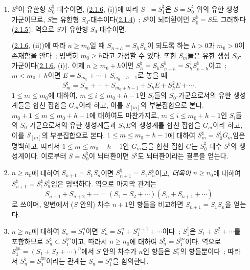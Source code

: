 \begin{enumerate}
\item[\rm(i)] $S^\natural$이 유한형 $S_0^\natural$-대수이면,
(\hyperref[II.2.1.6-ko]{2.1.6}, (i))에 따라
$S_+=S_1^\natural$은 $S=S_0^\natural$ 위의 유한 생성 가군이므로,
$S$는 유한형 $S_0$-대수이다(\hyperref[II.2.1.4-ko]{2.1.4})~;
$S^\natural$이 뇌터환이면 $S_0^\natural=S$도 그러하다
(\hyperref[II.2.1.5-ko]{2.1.5}). 역으로 $S$가 유한형 $S_0$-대수이면,

(\hyperref[II.2.1.6-ko]{2.1.6}, (ii))에 따라 $n\geq m_0$일 때
$S_{n+h}=S_hS_n$이 되도록 하는 $h>0$과 $m_0>0$이 존재함을 안다~;
명백히 $m_0\geq h$라고 가정할 수 있다. 또한 $S_m$들은 유한 생성
$S_0$-가군이다(\hyperref[II.2.1.6-ko]{2.1.6}, (i)). 이제
$n\geq m_0+h$이면 $S_n^\natural=S_hS_{n-h}^\natural
=S_h^\natural S_{n-h}^\natural$이고~; $m<m_0+h$이면
$E=S_{m_0}+\cdots+S_{m_0+h-1}$로 놓을 때
\[
  S_m^\natural=S_m+\cdots+S_{m_0+h-1}+S_hE+S_h^2E+\cdots.
\]
$1\leq m\leq m_0$에 대하여, $m\leq i\leq m_0+h-1$인 $S_i$들의
$S_0$-가군으로서의 유한 생성계들을 합친 집합을 $G_m$이라 하고,
이를 $S_{[m]}$의 부분집합으로 본다. $m_0+1\leq m\leq m_0+h-1$에
대하여도 마찬가지로, $m\leq i\leq m_0+h-1$인 $S_i$들의
$S_0$-가군으로서의 유한 생성계들과 $S_hE$의 생성계를 합친 집합을
$G_m$이라 하고, 이를 $S_{[m]}$의 부분집합으로 본다.
$1\leq m\leq m_0+h-1$에 대하여
$S_m^\natural=S_0^\natural G_m$임은 명백하고, 따라서
$1\leq m\leq m_0+h-1$인 $G_m$들을 합친 집합 $G$는
$S_0^\natural$-대수 $S^\natural$의
생성계이다. 이로부터 $S=S_0^\natural$이 뇌터환이면
$S^\natural$도 뇌터환이라는 결론을 얻는다.

\item[\rm(ii)] $n\geq n_0$에 대하여 $S_{n+1}=S_1S_n$이면
$S_{n+1}^\natural=S_1S_n^\natural$이고, 
\emph{더욱이} $n\geq n_0$에 대하여
$S_{n+1}^\natural=S_1^\natural S_n^\natural$임은 명백하다.
역으로 마지막 관계는
\[
  S_{n+1}+S_{n+2}+\cdots=(S_1+S_2+\cdots)(S_n+S_{n+1}+\cdots)
\]
로 쓰이며, 양변에서 ($S$ 안의) 차수 $n+1$인 항들을 비교하면
$S_{n+1}=S_1S_n$을 얻는다.

\item[\rm(iii)] $n\geq n_0$에 대하여 $S_n=S_1^n$이면
$S_n^\natural=S_1^n+S_1^{n+1}+\cdots$이다~;
$S_1^\natural$은 $S_1+S_1^2+\cdots$를 포함하므로
$S_n^\natural\subset S_1^{\natural n}$이고, 따라서 $n\geq n_0$에
대하여 $S_n^\natural=S_1^{\natural n}$이다. 역으로
$S_1^{\natural n}=(S_1+S_2+\cdots)^n$에서 $S$ 안의 차수가 $n$인
항들은 $S_1^n$의 항들뿐이다~; 따라서
$S_n^\natural=S_1^{\natural n}$이라는 관계는 $S_n=S_1^n$을 함의한다.


\end{enumerate}
